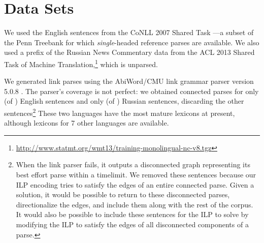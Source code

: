 \documentclass[a4paper,11pt]{article}
\newcommand{\Note}[4][]{\todo[author=#2,color=#3,fancyline,#1]{#4}}
\newcommand{\noteJE}[2][]{\Note[#1]{JE}{green!40}{#2}}
\newcommand{\NoteJE}[2][]{\noteJE[inline,#1]{#2}}
\begin{document}



\section{Data Sets}
We used the English sentences from the CoNLL 2007 Shared Task \cite{CONLL-SHARED-2007}---a subset of the Penn Treebank for which {\em single}-headed reference parses are available. 
We also used a prefix of the Russian News Commentary data from the ACL 2013 Shared Task of Machine Translation,\footnote{\url{http://www.statmt.org/wmt13/training-monolingual-nc-v8.tgz}} which is unparsed.

We generated link parses using the AbiWord/CMU link grammar parser version 5.0.8 \cite{LINKPARSER-2014}.  The parser's coverage is not perfect: we obtained connected parses for only (of $\!\!$) English sentences and only (of $\!\!$) Russian sentences, discarding the other sentences\footnote{When the link parser fails, it outputs a disconnected graph representing its best effort parse within a timelimit. We removed these sentences because our ILP encoding tries to satisfy the edges of an entire connected parse. Given a solution, it would be possible to return to these disconnected parses, directionalize the edges, and include them along with the rest of the corpus. It would also be possible to include these sentences for the ILP to solve by modifying the ILP to satisfy the edges of all disconnected components of a parse.}
These two languages have the most mature lexicons at present, although lexicons for 7 other languages are available.  
\end{document}
